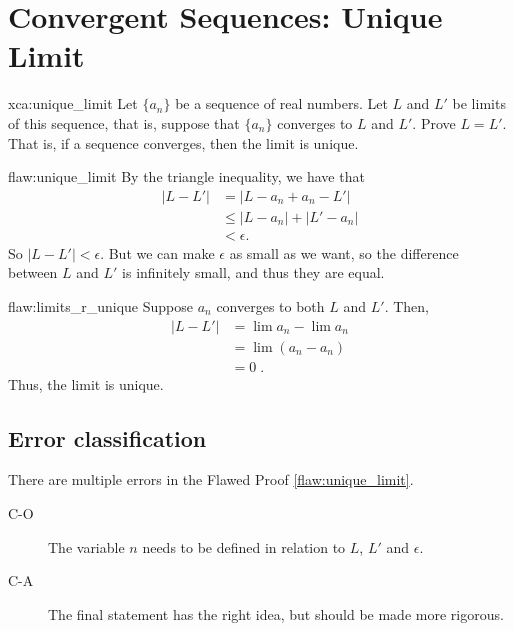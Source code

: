 \section{Convergent Sequences: Unique Limit}

\begin{xca}{xca:unique_limit}
Let $\{a_n\}$ be a sequence of real numbers. Let $L$ and $L'$ be limits of this sequence, that is, suppose that $\{a_n\}$ converges to $L$ and $L'$. Prove $L = L'$. That is, if a sequence converges, then the limit is unique.
\end{xca}

\begin{flaw}{flaw:unique_limit} %
By the triangle inequality, we have that
\begin{align*}
    |L - L'| &= |L - a_n + a_n - L'|\\
    &\leq |L - a_n| + |L' - a_n|\\
    &< \epsilon.
\end{align*}
So $|L - L'| < \epsilon$. But we can make $\epsilon$ as small as we want, so the difference between $L$ and $L'$ is infinitely small, and thus they are equal.
\end{flaw}

\begin{flaw}{flaw:limits_r_unique} %
Suppose $a_n$ converges to both $L$ and $L'.$ Then,
\begin{align*}
    |L - L' | &= \lim a_n - \lim a_n \\
    &= \lim (a_n - a_n) \\
    &= 0\;.
\end{align*}
Thus, the limit is unique.
\end{flaw}


\clearpage
\subsection{Error classification}

There are multiple errors
 in the Flawed Proof \ref{flaw:unique_limit}.

 \begin{description}
    \item[C-O] The variable $n$ needs to be defined in relation to $L$, $L'$ and $\epsilon$.
    \item[C-A] The final statement has the right idea, but should be made more rigorous.

 	
 \end{description}

